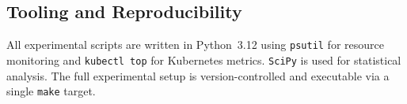 \subsection{Tooling and Reproducibility}

All experimental scripts are written in Python~3.12 using \texttt{psutil} for resource
monitoring and \texttt{kubectl top} for Kubernetes metrics. \texttt{SciPy} is used for
statistical analysis. The full experimental setup is version-controlled and executable via
a single \texttt{make} target.
